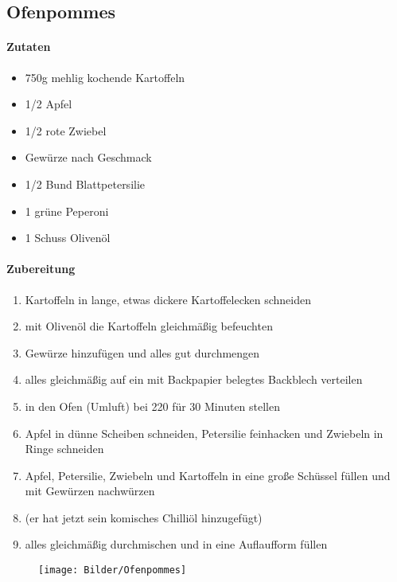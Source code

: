 \subsection{Ofenpommes}
\paragraph{Zutaten}
\begin{itemize}[noitemsep]
	\item 750g mehlig kochende Kartoffeln
	\item 1/2 Apfel
	\item 1/2 rote Zwiebel
	\item Gewürze nach Geschmack
	\item 1/2 Bund Blattpetersilie
	\item 1 grüne Peperoni
	\item 1 Schuss Olivenöl
\end{itemize}
\paragraph{Zubereitung}
\begin{enumerate}[noitemsep]
	\item Kartoffeln in lange, etwas dickere Kartoffelecken schneiden
	\item mit Olivenöl die Kartoffeln gleichmäßig befeuchten
	\item Gewürze hinzufügen und alles gut durchmengen 
	\item alles gleichmäßig auf ein mit Backpapier belegtes Backblech verteilen
	\item in den Ofen (Umluft) bei 220 \textdegree für 30 Minuten stellen
	\item Apfel in dünne Scheiben schneiden, Petersilie feinhacken und Zwiebeln in Ringe schneiden
	\item Apfel, Petersilie, Zwiebeln und Kartoffeln in eine große Schüssel füllen und mit Gewürzen nachwürzen 
	\item (er hat jetzt sein komisches Chilliöl hinzugefügt)
	\item alles gleichmäßig durchmischen und in eine Auflaufform füllen
\end{enumerate}
\begin{figure}[h]
\centering
\vspace{1.7cm}
\texttt{[image: Bilder/Ofenpommes]}
\end{figure}